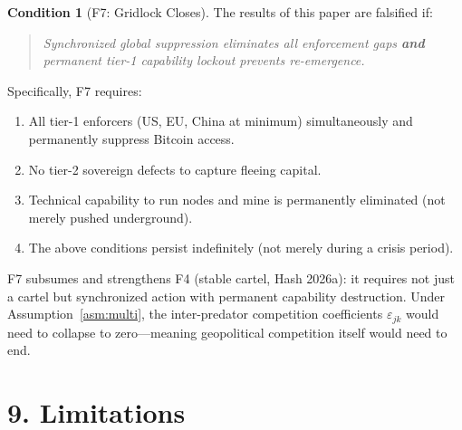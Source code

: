 \documentclass[12pt]{article}
\theoremstyle{definition}
\newtheorem{condition}{Condition}
\theoremstyle{remark}
\begin{document}
\begin{condition}[F7: Gridlock Closes]\label{cond:F7}
The results of this paper are falsified if:
\begin{quote}
\emph{Synchronized global suppression eliminates all enforcement gaps
\textbf{and} permanent tier-1 capability lockout prevents
re-emergence.}
\end{quote}
\end{condition}

Specifically, F7 requires:
\begin{enumerate}[label=(\roman*)]
  \item All tier-1 enforcers (US, EU, China at minimum) simultaneously
    and permanently suppress Bitcoin access.
  \item No tier-2 sovereign defects to capture fleeing capital.
  \item Technical capability to run nodes and mine is permanently
    eliminated (not merely pushed underground).
  \item The above conditions persist indefinitely (not merely during a
    crisis period).
\end{enumerate}

F7 subsumes and strengthens F4 (stable cartel, Hash 2026a): it requires
not just a cartel but synchronized action with permanent capability
destruction. Under Assumption~\ref{asm:multi}, the inter-predator
competition coefficients $\varepsilon_{jk}$ would need to collapse to
zero---meaning geopolitical competition itself would need to end.

\section{9. Limitations}\label{sec:limitations}
\end{document}
